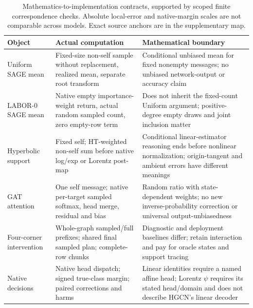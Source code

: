 \begin{table}[t]
\caption{Mathematics-to-implementation contracts, supported by scoped finite correspondence checks. Absolute local-error and native-margin scales are not comparable across models. Exact source anchors are in the supplementary map.}
\label{tab:source-map}
\begin{tabular}{p{}p{}p{}}
\toprule
Object & Actual computation & Mathematical boundary \\
\midrule
Uniform SAGE mean & Fixed-size non-self sample without replacement, realized mean, separate root transform & Conditional unbiased mean for fixed nonempty messages; no unbiased network-output or accuracy claim \\
LABOR-0 SAGE mean & Native empty importance-weight return, actual random sampled count, zero empty-row term & Does not inherit the fixed-count Uniform argument; positive-degree empty draws and joint inclusion matter \\
Hyperbolic support & Fixed self; HT-weighted non-self sum before native log/exp or Lorentz post-map & Conditional linear-estimator reasoning ends before nonlinear normalization; origin-tangent and ambient errors have different meanings \\
GAT attention & One self message; native per-target sampled softmax, head merge, residual and bias & Random ratio with state-dependent weights; no new inverse-probability correction or universal output-unbiasedness \\
Four-corner intervention & Whole-graph sampled/full prefixes; shared final sampled plan; complete-row chunks & Diagnostic and deployment baselines differ; retain interaction and pay for oracle states and support tracing \\
Native decisions & Native head dispatch; signed true-class margin; paired corrections and harms & Linear identities require a named affine head; Lorentz $\psi$ requires its stated head/domain and does not describe HGCN's linear decoder \\
\bottomrule
\end{tabular}
\end{table}

